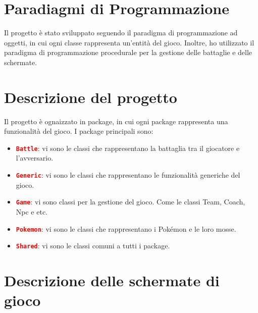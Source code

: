 \documentclass[12pt]{article}
\begin{document}
\section{Paradiagmi di Programmazione}
Il progetto è stato sviluppato seguendo il paradigma di programmazione ad oggetti, in cui ogni classe rappresenta un'entità del gioco. Inoltre, ho utilizzato il paradigma di programmazione procedurale per la gestione delle battaglie e delle schermate.

\newpage
\section{Descrizione del progetto}
Il progetto è ognaizzato in package, in cui ogni package rappresenta una funzionalità del gioco. I package principali sono:
\begin{itemize}
    \item \textbf{\texttt{\textcolor{red}{Battle}}}: vi sono le classi che rappresentano la battaglia tra il giocatore e l'avversario.
    \item \textbf{\texttt{\textcolor{red}{Generic}}}: vi sono le classi che rappresentano le funzionalità generiche del gioco.
    \item \textbf{\texttt{\textcolor{red}{Game}}}: vi sono classi per la gestione del gioco. Come le classi Team, Coach, Npc e etc.
    \item \textbf{\texttt{\textcolor{red}{Pokemon}}}: vi sono le classi che rappresentano i Pokémon e le loro mosse.
    \item \textbf{\texttt{\textcolor{red}{Shared}}}: vi sono le classi comuni a tutti i package.
\end{itemize}
\par\medskip\noindent 
\section{Descrizione delle schermate di gioco}
\end{document}
